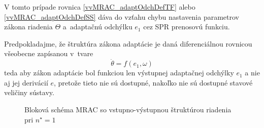 \documentclass[a4paper, 10pt, ]{article}
\begin{document}
V tomto prípade rovnica \eqref{vvMRAC_adaptOdchDefTF} alebo \eqref{vvMRAC_adaptOdchDefSS} dáva do vzťahu chybu nastavenia parametrov zákona riadenia $\Theta$ a~adaptačnú odchýlku $e_1$ cez SPR prenosovú funkciu.

Predpokladajme, že štruktúra zákona adaptácie je daná diferenciálnou rovnicou všeobecne zapísanou v~tvare
\begin{equation}
	\dot{\theta} = f(e_1, \omega)
\end{equation}
teda aby zákon adaptácie bol funkciou len výstupnej adaptačnej odchýlky $e_1$ a nie aj jej derivácií $e$, pretože tieto nie sú dostupné, nakoľko nie sú dostupné stavové veličiny sústavy.







\begin{figure}[t]
	\centering


	\caption{Bloková schéma MRAC so vstupno-výstupnou štruktúrou riadenia pri $n^\star = 1$}
	\label{Bloková schéma MRAC so vstupno-výstupnou štruktúrou riadenia}
\end{figure}
\end{document}
